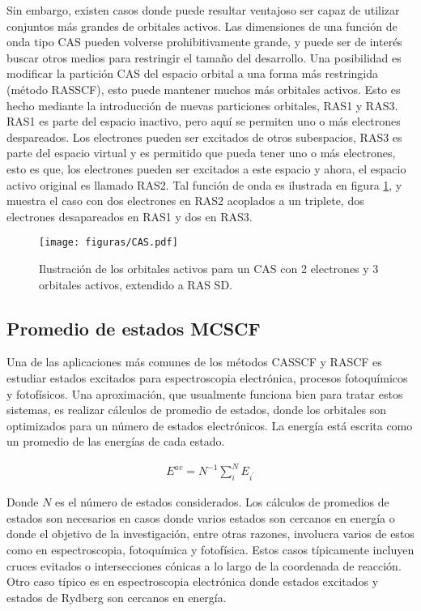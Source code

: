 \documentclass[12pt]{report}
\begin{document}
Sin embargo, existen casos donde puede resultar ventajoso ser capaz de utilizar conjuntos más grandes de orbitales activos. Las dimensiones de una función de onda tipo CAS pueden volverse prohibitivamente grande, y puede ser de interés buscar otros medios para restringir el tamaño del desarrollo. Una posibilidad es modificar la partición CAS del espacio orbital a una forma más restringida (método RASSCF), esto puede mantener muchos más orbitales activos. Esto es hecho mediante la introducción de nuevas particiones orbitales, RAS1 y RAS3. RAS1 es parte del espacio inactivo, pero aquí se permiten uno o más electrones despareados. Los electrones pueden ser excitados de otros subespacios, RAS3 es parte del espacio virtual y es permitido que pueda tener uno o más electrones, esto es que, los electrones pueden ser excitados a este espacio y ahora, el espacio activo original es llamado RAS2. Tal función de onda es ilustrada en figura \ref{casras}, y muestra el caso con dos electrones en RAS2 acoplados a un triplete, dos electrones desapareados en RAS1 y dos en RAS3.


\begin{figure}[h]
\centering
\texttt{[image: figuras/CAS.pdf]} 
\caption{Ilustración de los orbitales activos para un CAS con 2 electrones y 3 orbitales activos, extendido a RAS SD.}
\label{casras}
\end{figure}

\newpage

\subsection{Promedio de estados MCSCF}

Una de las aplicaciones más comunes de los métodos CASSCF y RASCF es estudiar estados excitados para espectroscopia electrónica, procesos fotoquímicos y fotofísicos. Una aproximación, que usualmente funciona bien para tratar estos sistemas, es realizar cálculos de promedio de estados, donde los orbitales son optimizados para un número de estados electrónicos. La energía está escrita como un promedio de las energías de cada estado.

\begin{align}
E^{av}=N^{-1}\displaystyle\sum_{i}^{N} E_{i^{\prime}}
\end{align}

Donde $N$ es el número de estados considerados. 
Los cálculos de promedios de estados son necesarios en casos donde varios estados son cercanos en energía o donde el objetivo de la investigación, entre otras razones, involucra varios de estos como en espectroscopia, fotoquímica y fotofísica. Estos casos típicamente incluyen cruces evitados o intersecciones cónicas a lo largo de la coordenada de reacción. Otro caso típico es en espectroscopia electrónica donde estados excitados y estados de Rydberg son cercanos en energía.
\end{document}
